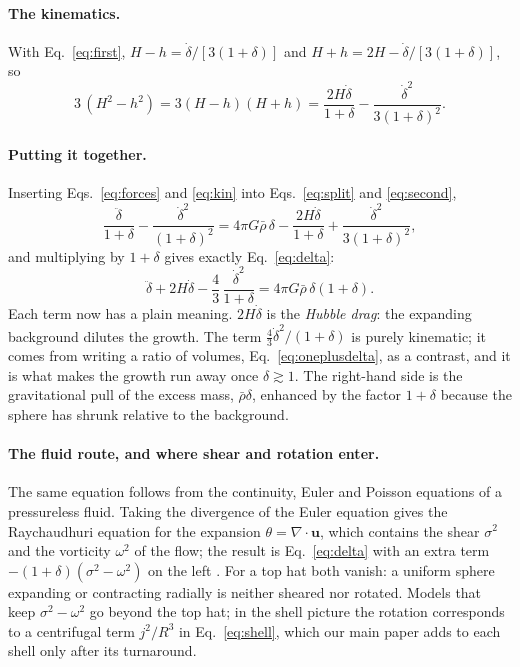 \documentclass[11pt,a4paper]{article}
\begin{document}
\paragraph{The kinematics.} With Eq.~\eqref{eq:first},
$H-h=\dot\delta/[3(1+\delta)]$ and
$H+h=2H-\dot\delta/[3(1+\delta)]$, so
\begin{equation}
  3\,(H^{2}-h^{2})=3(H-h)(H+h)
  =\frac{2H\dot\delta}{1+\delta}-\frac{\dot\delta^{2}}{3(1+\delta)^{2}} .
  \label{eq:kin}
\end{equation}

\paragraph{Putting it together.} Inserting Eqs.~\eqref{eq:forces} and
\eqref{eq:kin} into Eqs.~\eqref{eq:split} and \eqref{eq:second},
\begin{equation*}
  \frac{\ddot\delta}{1+\delta}-\frac{\dot\delta^{2}}{(1+\delta)^{2}}
  =4\pi G\bar\rho\,\delta-\frac{2H\dot\delta}{1+\delta}
  +\frac{\dot\delta^{2}}{3(1+\delta)^{2}},
\end{equation*}
and multiplying by $1+\delta$ gives exactly Eq.~\eqref{eq:delta}:
\begin{equation*}
  \ddot\delta+2H\dot\delta-\frac43\,\frac{\dot\delta^{2}}{1+\delta}
  =4\pi G\bar\rho\,\delta(1+\delta).
\end{equation*}
Each term now has a plain meaning. $2H\dot\delta$ is the \emph{Hubble
drag}: the expanding background dilutes the growth. The term
$\frac43\dot\delta^{2}/(1+\delta)$ is purely kinematic; it comes from
writing a ratio of volumes, Eq.~\eqref{eq:oneplusdelta}, as a contrast,
and it is what makes the growth run away once $\delta\gtrsim1$. The right-hand
side is the gravitational pull of the excess mass, $\bar\rho\delta$,
enhanced by the factor $1+\delta$ because the sphere has shrunk relative
to the background.

\paragraph{The fluid route, and where shear and rotation enter.} The same
equation follows from the continuity, Euler and Poisson equations of a
pressureless fluid. Taking the divergence of the Euler equation gives
the Raychaudhuri equation for the expansion $\theta=\nabla\cdot\mathbf u$,
which contains the shear $\sigma^{2}$ and the vorticity $\omega^{2}$ of the
flow; the result is Eq.~\eqref{eq:delta} with an extra term
$-(1+\delta)(\sigma^{2}-\omega^{2})$ on the left
\citep{Fosalba1998,DelPopolo2013}. For a top hat both vanish: a uniform
sphere expanding or contracting radially is neither sheared nor rotated.
Models that keep $\sigma^{2}-\omega^{2}$ go beyond the top hat; in the shell
picture the rotation corresponds to a centrifugal term $j^{2}/R^{3}$ in
Eq.~\eqref{eq:shell}, which our main paper adds to each shell only after
its turnaround.
\end{document}
